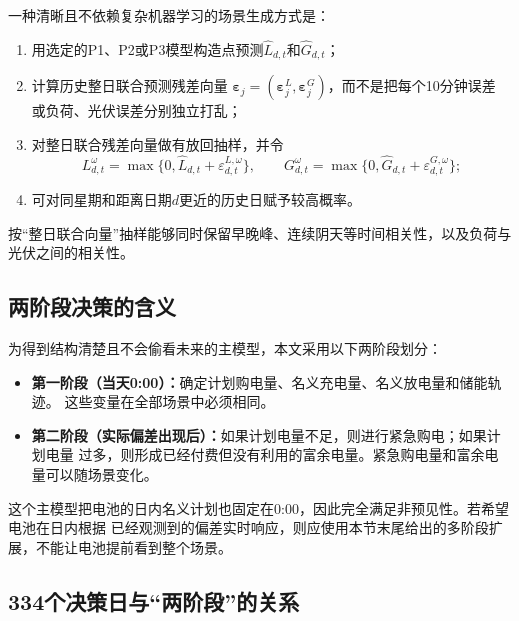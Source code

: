 \documentclass[UTF8,11pt]{ctexart}
\begin{document}
一种清晰且不依赖复杂机器学习的场景生成方式是：
\begin{enumerate}[label=(\arabic*)]
    \item 用选定的P1、P2或P3模型构造点预测$\widehat L_{d,t}$和$\widehat G_{d,t}$；
    \item 计算历史整日联合预测残差向量
    $\bm\varepsilon_j=(\bm\varepsilon^L_j,\bm\varepsilon^G_j)$，而不是把每个10分钟误差
    或负荷、光伏误差分别独立打乱；
    \item 对整日联合残差向量做有放回抽样，并令
    \begin{equation}
        L^{\omega}_{d,t}=\max\{0,\widehat L_{d,t}+\varepsilon^{L,\omega}_{d,t}\},
        \qquad
        G^{\omega}_{d,t}=\max\{0,\widehat G_{d,t}+\varepsilon^{G,\omega}_{d,t}\};
    \end{equation}
    \item 可对同星期和距离日期$d$更近的历史日赋予较高概率。
\end{enumerate}
按“整日联合向量”抽样能够同时保留早晚峰、连续阴天等时间相关性，以及负荷与光伏之间的相关性。

\subsection{两阶段决策的含义}

为得到结构清楚且不会偷看未来的主模型，本文采用以下两阶段划分：
\begin{itemize}
    \item \textbf{第一阶段（当天0:00）：}确定计划购电量、名义充电量、名义放电量和储能轨迹。
    这些变量在全部场景中必须相同。
    \item \textbf{第二阶段（实际偏差出现后）：}如果计划电量不足，则进行紧急购电；如果计划电量
    过多，则形成已经付费但没有利用的富余电量。紧急购电量和富余电量可以随场景变化。
\end{itemize}

这个主模型把电池的日内名义计划也固定在0:00，因此完全满足非预见性。若希望电池在日内根据
已经观测到的偏差实时响应，则应使用本节末尾给出的多阶段扩展，不能让电池提前看到整个场景。

\subsection{334个决策日与“两阶段”的关系}
\end{document}
